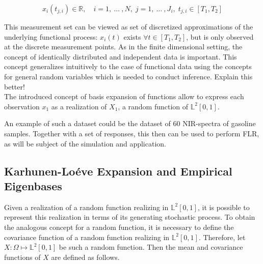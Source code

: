 \documentclass[11pt,twoside,a4paper]{article}
\begin{document}
	\begin{equation}
		x_{i}(t_{j,i}) \in \mathbb{R}, \quad i = 1,\: \dots\: ,N, \; j = 1, \: \dots \:, J_i, \; t_{j,i} \in [T_1, T_2]
	\end{equation}
	
	This measurement set can be viewed as set of discretized approximations of the underlying functional process:
 $x_i(t)$ exists $\forall t \in [T_1, T_2]$, but is only observed at the discrete measurement points. 
As in the finite dimensional setting, the concept of identically distributed and independent data is important. This concept generalizes intuitively to the case of functional data using the concepts for general random variables which is needed to conduct inference. {\color{red} Explain this better!}\\  The introduced concept of basis expansion of functions allow to express each observation $x_1$ as a realization of $X_1$, a random function of $\mathbb{L}^2[0,1]$. 
 
	 
	An example of such a dataset could be the dataset of 60 NIR-spectra of gasoline samples. Together with a set of responses, this then can be used to perform FLR, as will be subject of the simulation and application.	 
		 
	
	\subsection{Karhunen-Lo\'{e}ve Expansion and Empirical Eigenbases}\hypertarget{KL}{}
	Given a realization of a random function realizing in $\mathbb{L}^2[0,1]$, it is possible to represent this realization in terms of its generating stochastic process. To obtain the analogous concept for a random function, it is necessary to define the covariance function of a random function realizing in $\mathbb{L}^2[0,1]$. Therefore, let $X: \Omega \mapsto \mathbb{L}^2[0,1]$ be such a random function. Then the mean and covariance functions of $X$ are defined as follows.
	
\end{document}
